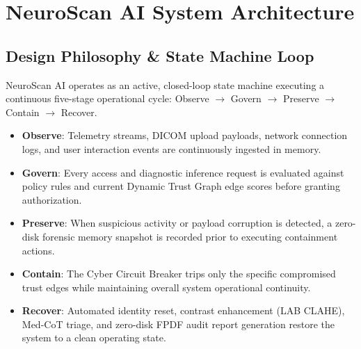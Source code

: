 \documentclass[conference]{IEEEtran}
\begin{document}
\section{NeuroScan AI System Architecture}
\subsection{Design Philosophy \& State Machine Loop}
NeuroScan AI operates as an active, closed-loop state machine executing a continuous five-stage operational cycle: Observe $\rightarrow$ Govern $\rightarrow$ Preserve $\rightarrow$ Contain $\rightarrow$ Recover.
\begin{itemize}
    \item \textbf{Observe}: Telemetry streams, DICOM upload payloads, network connection logs, and user interaction events are continuously ingested in memory.
    \item \textbf{Govern}: Every access and diagnostic inference request is evaluated against policy rules and current Dynamic Trust Graph edge scores before granting authorization.
    \item \textbf{Preserve}: When suspicious activity or payload corruption is detected, a zero-disk forensic memory snapshot is recorded prior to executing containment actions.
    \item \textbf{Contain}: The Cyber Circuit Breaker trips only the specific compromised trust edges while maintaining overall system operational continuity.
    \item \textbf{Recover}: Automated identity reset, contrast enhancement (LAB CLAHE), Med-CoT triage, and zero-disk FPDF audit report generation restore the system to a clean operating state.
\end{itemize}
\end{document}
